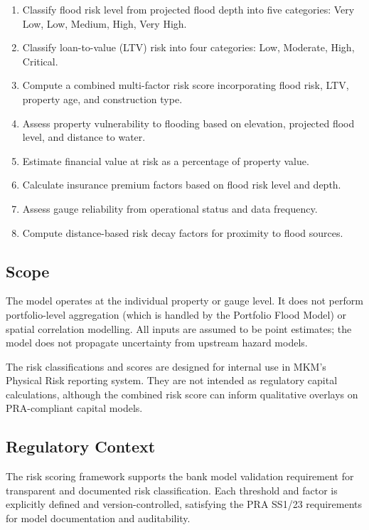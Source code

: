 \documentclass[11pt,a4paper]{article}
\begin{document}
\begin{enumerate}[label=(\roman*)]
    \item Classify flood risk level from projected flood depth into five categories: Very Low, Low, Medium, High, Very High.
    \item Classify loan-to-value (LTV) risk into four categories: Low, Moderate, High, Critical.
    \item Compute a combined multi-factor risk score incorporating flood risk, LTV, property age, and construction type.
    \item Assess property vulnerability to flooding based on elevation, projected flood level, and distance to water.
    \item Estimate financial value at risk as a percentage of property value.
    \item Calculate insurance premium factors based on flood risk level and depth.
    \item Assess gauge reliability from operational status and data frequency.
    \item Compute distance-based risk decay factors for proximity to flood sources.
\end{enumerate}

\subsection{Scope}

The model operates at the individual property or gauge level. It does not perform portfolio-level aggregation (which is handled by the Portfolio Flood Model) or spatial correlation modelling. All inputs are assumed to be point estimates; the model does not propagate uncertainty from upstream hazard models.

The risk classifications and scores are designed for internal use in MKM's Physical Risk reporting system. They are not intended as regulatory capital calculations, although the combined risk score can inform qualitative overlays on PRA-compliant capital models.

\subsection{Regulatory Context}

The risk scoring framework supports the bank model validation requirement for transparent and documented risk classification. Each threshold and factor is explicitly defined and version-controlled, satisfying the PRA SS1/23 requirements for model documentation and auditability.
\end{document}
